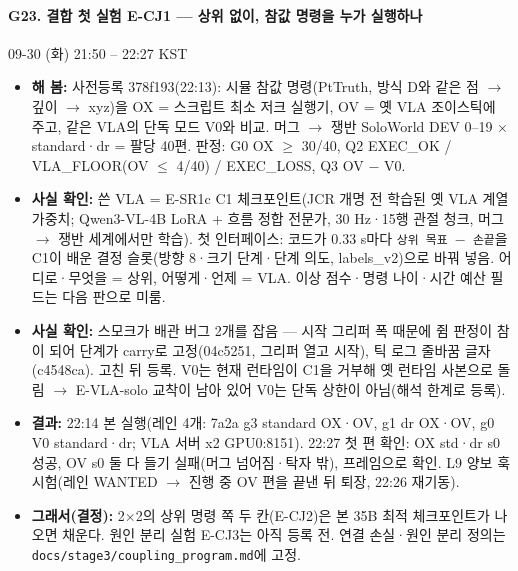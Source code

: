 \paragraph{G23. 결합 첫 실험 E-CJ1 --- 상위 없이, 참값 명령을 누가 실행하나}
{\small 09-30 (화) 21:50 -- 22:27 KST}
\begin{itemize}
  \item \textbf{해 봄:} 사전등록 378f193(22:13): 시뮬 참값 명령(PtTruth, 방식 D와 같은 점 $\rightarrow$ 깊이 $\rightarrow$ xyz)을 OX = 스크립트 최소 저크 실행기, OV = 옛 VLA 조이스틱에 주고, 같은 VLA의 단독 모드 V0와 비교. 머그 $\rightarrow$ 쟁반 SoloWorld DEV 0--19 $\times$ standard·dr = 팔당 40편. 판정: G0 OX $\geq$ 30/40, Q2 EXEC\_OK / VLA\_FLOOR(OV $\leq$ 4/40) / EXEC\_LOSS, Q3 OV $-$ V0.
  \item \textbf{사실 확인:} 쓴 VLA = E-SR1c C1 체크포인트(JCR 개명 전 학습된 옛 VLA 계열 가중치; Qwen3-VL-4B LoRA + 흐름 정합 전문가, 30 Hz·15행 관절 청크, 머그 $\rightarrow$ 쟁반 세계에서만 학습). 첫 인터페이스: 코드가 0.33 s마다 \texttt{상위 목표 $-\allowbreak{}$ 손끝}을 C1이 배운 결정 슬롯(방향 8·크기 단계·단계 의도, labels\_v2)으로 바꿔 넣음. 어디로·무엇을 = 상위, 어떻게·언제 = VLA. 이상 점수·명령 나이·시간 예산 필드는 다음 판으로 미룸.
  \item \textbf{사실 확인:} 스모크가 배관 버그 2개를 잡음 --- 시작 그리퍼 폭 때문에 쥠 판정이 참이 되어 단계가 carry로 고정(04c5251, 그리퍼 열고 시작), 틱 로그 줄바꿈 글자(c4548ca). 고친 뒤 등록. V0는 현재 런타임이 C1을 거부해 옛 런타임 사본으로 돌림 $\rightarrow$ E-VLA-solo 교착이 남아 있어 V0는 단독 상한이 아님(해석 한계로 등록).
  \item \textbf{결과:} 22:14 본 실행(레인 4개: 7a2a g3 standard OX·OV, g1 dr OX·OV, g0 V0 standard·dr; VLA 서버 x2 GPU0:8151). 22:27 첫 편 확인: OX std·dr s0 성공, OV s0 둘 다 들기 실패(머그 넘어짐·탁자 밖), 프레임으로 확인. L9 양보 훅 시험(레인 WANTED $\rightarrow$ 진행 중 OV 편을 끝낸 뒤 퇴장, 22:26 재기동).
  \item \textbf{그래서(결정):} 2$\times$2의 상위 명령 쪽 두 칸(E-CJ2)은 본 35B 최적 체크포인트가 나오면 채운다. 원인 분리 실험 E-CJ3는 아직 등록 전. 연결 손실·원인 분리 정의는 \texttt{docs/\allowbreak{}stage3/\allowbreak{}coupling\_\allowbreak{}program.\allowbreak{}md}에 고정.
\end{itemize}

